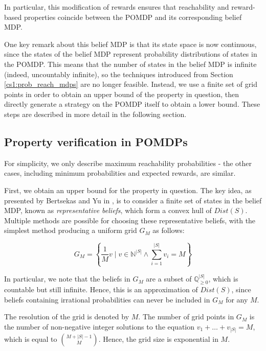 In particular, this modification of rewards ensures that reachability and reward-based properties coincide between the POMDP and its corresponding belief MDP.

One key remark about this belief MDP is that its state space is now continuous, since the states of the belief MDP represent probability distributions of states in the POMDP. This means that the number of states in the belief MDP is infinite (indeed, uncountably infinite), so the techniques introduced from Section \ref{cs1:prob_reach_mdps} are no longer feasible. Instead, we use a finite set of grid points in order to obtain an upper bound of the property in question, then directly generate a strategy on the POMDP itself to obtain a lower bound. These steps are described in more detail in the following section.

\subsection{Property verification in POMDPs}
\label{cs2:properties_pomdps}

For simplicity, we only describe maximum reachability probabilities - the other cases, including minimum probabilities and expected rewards, are similar.

First, we obtain an upper bound for the property in question. The key idea, as presented by Bertsekas and Yu in \cite{bertsekas_approximate_2006}, is to consider a finite set of states in the belief MDP, known as \emph{representative beliefs}, which form a convex hull of $Dist(S)$. Multiple methods are possible for choosing these representative beliefs, with the simplest method producing a uniform grid $G_M$ as follows:

\begin{equation*}
    G_M = \left\{\frac{1}{M} v \mid v \in \mathbb{N}^{|S|} \wedge \mbox{$\sum_{i=1}^{|S|}$} v_i = M \right\}
\end{equation*}

In particular, we note that the beliefs in $G_M$ are a subset of $\mathbb{Q}_{\geq 0}^{|S|}$, which is countable but still infinite. Hence, this is an approximation of $Dist(S)$, since beliefs containing irrational probabilities can never be included in $G_M$ for any $M$.

The resolution of the grid is denoted by $M$. The number of grid points in $G_M$ is the number of non-negative integer solutions to the equation $v_1 + \dots + v_{|S|} = M$, which is equal to ${M + |S| - 1 \choose M}$. Hence, the grid size is exponential in $M$.

